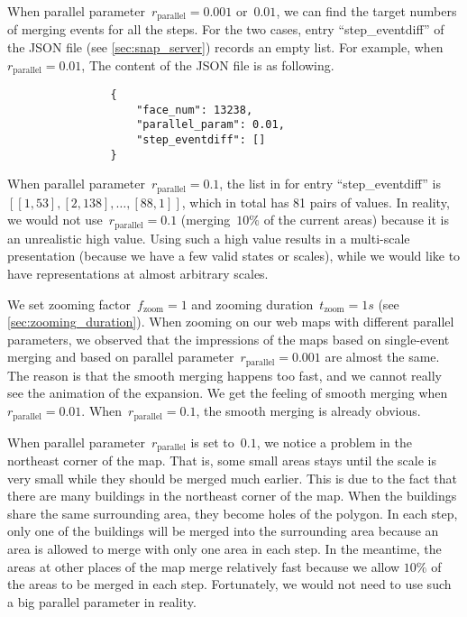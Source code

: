 \documentclass[ijgi,article,submit,moreauthors,pdftex]{Definitions/mdpi}
\begin{document}
When parallel parameter~$r_\mathrm{parallel}= 0.001$ or~$0.01$,
we can find the target numbers of merging events for all the steps.
For the two cases, entry ``step\_eventdiff'' of the JSON file
(see \sect\ref{sec:snap_server})
records an empty list.
For example, when~$r_\mathrm{parallel}= 0.01$,
The content of the JSON file is as following.
\begin{verbatim}
                {
                    "face_num": 13238,
                    "parallel_param": 0.01,                    
                    "step_eventdiff": []
                }
\end{verbatim}
When parallel parameter~$r_\mathrm{parallel}= 0.1$,
the list in for entry ``step\_eventdiff'' is  
$[[1, 53], [2, 138], \dots, [88, 1]]$,
which in total has 81 pairs of values.
In reality, we would not use~$r_\mathrm{parallel}= 0.1$
(merging~$10\%$ of the current areas)
because it is an unrealistic high value.
Using such a high value results in a multi-scale presentation
(because we have a few valid states or scales),
while we would like to have representations at almost
arbitrary scales.

We set zooming factor~$f_\mathrm{zoom}=1$ and 
zooming duration~$t_\mathrm{zoom}=1 s$ 
(see \sect\ref{sec:zooming_duration}).
When zooming on our web maps with different parallel parameters,
we observed that the impressions of the maps 
based on single-event merging and based on parallel parameter~$r_\mathrm{parallel}= 0.001$ 
are almost the same.
The reason is that the smooth merging happens too fast,
and we cannot really see the animation of the expansion.
We get the feeling of smooth merging when~$r_\mathrm{parallel}= 0.01$.
When~$r_\mathrm{parallel}= 0.1$, the smooth merging is already obvious.


When parallel parameter~$r_\mathrm{parallel}$ is set to~$0.1$,
we notice a problem in the northeast corner of the map.
That is, some small areas stays until the scale is very small
while they should be merged much earlier.
This is due to the fact that 
there are many buildings in the northeast corner of the map.
When the buildings share the same surrounding area,
they become holes of the polygon.
In each step, only one of the buildings will be merged into the surrounding area
because an area is allowed to merge with only one area in each step.
In the meantime, the areas at other places of the map merge relatively fast
because we allow $10\%$ of the areas to be merged in each step.
Fortunately, we would not need to use such a big parallel parameter in reality.
\end{document}
